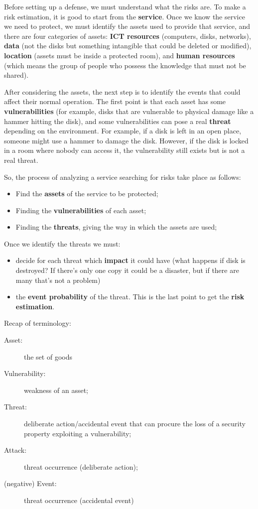 Before setting up a defense, we must understand what the risks are. To make a risk estimation, it is good to start from the \textbf{service}. Once we know the service we need to protect, we must identify the assets used to provide that service, and there are four categories of assets: \textbf{ICT resources} (computers, disks, networks), \textbf{data} (not the disks but something intangible that could be deleted or modified), \textbf{location} (assets must be inside a protected room), and \textbf{human resources} (which means the group of people who possess the knowledge that must not be shared).

After considering the assets, the next step is to identify the events that could affect their normal operation. The first point is that each asset has some \textbf{vulnerabilities} (for example, disks that are vulnerable to physical damage like a hammer hitting the disk), and some vulnerabilities can pose a real \textbf{threat} depending on the environment. For example, if a disk is left in an open place, someone might use a hammer to damage the disk. However, if the disk is locked in a room where nobody can access it, the vulnerability still exists but is not a real threat.

\vspace{5mm}
So, the process of analyzing a service searching for risks take place as follows:
\begin{itemize}
	\item Find the \textbf{assets} of the service to be protected;
	\item Finding the \textbf{vulnerabilities} of each asset;
	\item Finding the \textbf{threats}, giving the way in which the assets are used;
\end{itemize}

\vspace{5mm}
Once we identify the threats we must:
\begin{itemize}
	\item decide for each threat which \textbf{impact} it could have (what happens if disk is destroyed? If there's only one copy it could be a disaster, but if there are many that's not a problem)
	\item the \textbf{event probability} of the threat. This is the last point to get the \textbf{risk estimation}.
\end{itemize}

\bigskip
Recap of terminology:
\begin{description}
	\item[Asset:] the set of goods
	\item[Vulnerability:] weakness of an asset;
	\item[Threat:] deliberate action/accidental event that can procure the loss of a security property exploiting a vulnerability;
	\item[Attack:] threat occurrence (deliberate action);
	\item[(negative) Event:] threat occurrence (accidental event)
\end{description}



